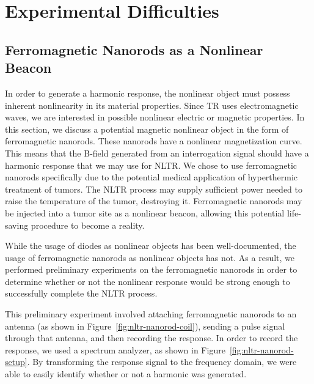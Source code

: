 \section{Experimental Difficulties}
\label{sec:nltr-expr-diff}

\subsection{Ferromagnetic Nanorods as a Nonlinear Beacon}

In order to generate a harmonic response, the nonlinear object must possess inherent nonlinearity in its material properties. Since TR uses electromagnetic waves, we are interested in possible nonlinear electric or magnetic properties. In this section, we discuss a potential magnetic nonlinear object in the form of ferromagnetic nanorods. These nanorods have a nonlinear magnetization curve. This means that the B-field generated from an interrogation signal should have a harmonic response that we may use for NLTR. We chose to use ferromagnetic nanorods specifically due to the potential medical application of hyperthermic treatment of tumors. The NLTR process may supply sufficient power needed to raise the temperature of the tumor, destroying it. Ferromagnetic nanorods may be injected into a tumor site as a nonlinear beacon, allowing this potential life-saving procedure to become a reality.

While the usage of diodes as nonlinear objects has been well-documented, the usage of ferromagnetic nanorods as nonlinear objects has not. As a result, we performed preliminary experiments on the ferromagnetic nanorods in order to determine whether or not the nonlinear response would be strong enough to successfully complete the NLTR process.

This preliminary experiment involved attaching ferromagnetic nanorods to an antenna (as shown in Figure~\ref{fig:nltr-nanorod-coil}), sending a pulse signal through that antenna, and then recording the response. In order to record the response, we used a spectrum analyzer, as shown in Figure~\ref{fig:nltr-nanorod-setup}. By transforming the response signal to the frequency domain, we were able to easily identify whether or not a harmonic was generated.

